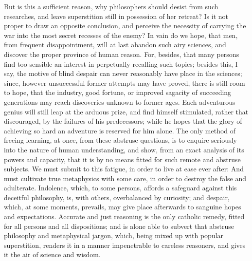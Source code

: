 \documentclass[]{article}
\begin{document}
\begin{sectionbody}
\humeparagraph  But is this a sufficient reason, why philosophers should desist from such researches, and leave superstition still in possession of her retreat? Is it not proper to draw an opposite conclusion, and perceive the necessity of carrying the war into the most secret recesses of the enemy? In vain do we hope, that men, from frequent disappointment, will at last abandon such airy sciences, and discover the proper province of human reason. For, besides, that many persons find too sensible an interest in perpetually recalling such topics; besides this, I say, the motive of blind despair can never reasonably have place in the sciences; since, however unsuccessful former attempts may have proved, there is still room to hope, that the industry, good fortune, or improved sagacity of succeeding generations may reach discoveries unknown to former ages. Each adventurous genius will still leap at the arduous prize, and find himself stimulated, rather that discouraged, by the failures of his predecessors; while he hopes that the glory of achieving so hard an adventure is reserved for him alone. The only method of freeing learning, at once, from these abstruse questions, is to enquire seriously into the nature of human understanding, and show, from an exact analysis of its powers and capacity, that it is by no means fitted for such remote and abstruse subjects. We must submit to this fatigue, in order to live at ease ever after: And must cultivate true metaphysics with some care, in order to destroy the false and adulterate. Indolence, which, to some persons, affords a safeguard against this deceitful philosophy, is, with others, overbalanced by curiosity; and despair, which, at some moments, prevails, may give place afterwards to sanguine hopes and expectations. Accurate and just reasoning is the only catholic remedy, fitted for all persons and all dispositions; and is alone able to subvert that abstruse philosophy and metaphysical jargon, which, being mixed up with popular superstition, renders it in a manner impenetrable to careless reasoners, and gives it the air of science and wisdom.


\end{sectionbody}
\end{document}
